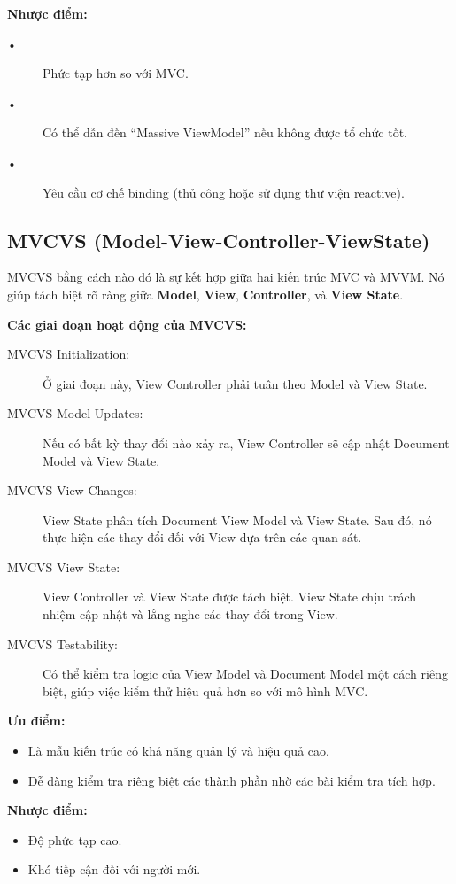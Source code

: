     \vspace{1em}
    \textbf{Nhược điểm:}
    \begin{description}
    \item[•] Phức tạp hơn so với MVC.
    \item[•] Có thể dẫn đến ``Massive ViewModel'' nếu không được tổ chức tốt.
    \item[•] Yêu cầu cơ chế binding (thủ công hoặc sử dụng thư viện reactive).
    \end{description}
    \subsection{MVCVS (Model-View-Controller-ViewState)}

    MVCVS bằng cách nào đó là sự kết hợp giữa hai kiến trúc MVC và MVVM. Nó giúp tách biệt rõ ràng giữa \textbf{Model}, \textbf{View}, \textbf{Controller}, và \textbf{View State}.
    
    \textbf{Các giai đoạn hoạt động của MVCVS:}
    \begin{description}
      \item[MVCVS Initialization:] Ở giai đoạn này, View Controller phải tuân theo Model và View State.
      \item[MVCVS Model Updates:] Nếu có bất kỳ thay đổi nào xảy ra, View Controller sẽ cập nhật Document Model và View State.
      \item[MVCVS View Changes:] View State phân tích Document View Model và View State. Sau đó, nó thực hiện các thay đổi đối với View dựa trên các quan sát.
      \item[MVCVS View State:] View Controller và View State được tách biệt. View State chịu trách nhiệm cập nhật và lắng nghe các thay đổi trong View.
      \item[MVCVS Testability:] Có thể kiểm tra logic của View Model và Document Model một cách riêng biệt, giúp việc kiểm thử hiệu quả hơn so với mô hình MVC.
    \end{description}
    
    \textbf{Ưu điểm:}
    \begin{itemize}
      \item Là mẫu kiến trúc có khả năng quản lý và hiệu quả cao.
      \item Dễ dàng kiểm tra riêng biệt các thành phần nhờ các bài kiểm tra tích hợp.
    \end{itemize}
    
    \textbf{Nhược điểm:}
    \begin{itemize}
      \item Độ phức tạp cao.
      \item Khó tiếp cận đối với người mới.
    \end{itemize}
    
